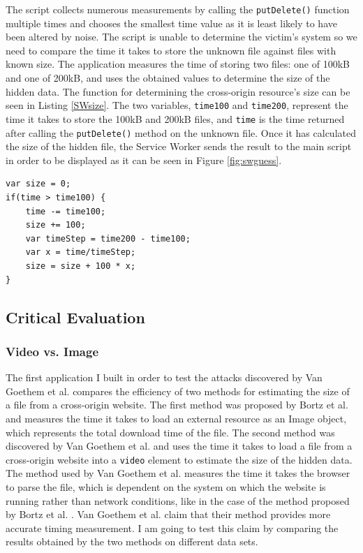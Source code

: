 \documentclass[10pt,a4paper,twoside]{book}
\begin{document}
The script collects numerous measurements by calling the \texttt{putDelete()} function multiple times and chooses the smallest time value as it is least likely to have been altered by noise. The script is unable to determine the victim's system so we need to compare the time it takes to store the unknown file against files with known size. The application measures the time of storing two files: one of 100kB and one of 200kB, and uses the obtained values to determine the size of the hidden data. The function for determining the cross-origin resource's size can be seen in Listing \ref{SWsize}. The two variables, \texttt{time100} and \texttt{time200}, represent the time it takes to store the 100kB and 200kB files, and \texttt{time} is the time returned after calling the \texttt{putDelete()} method on the unknown file. Once it has calculated the size of the hidden file, the Service Worker sends the result to the main script in order to be displayed as it can be seen in Figure \ref{fig:swguess}.

\begin{lstlisting}[caption={JavaScript code for estimating the size of a file.},label={SWsize}]
var size = 0;
if(time > time100) {
    time -= time100;
    size += 100;
    var timeStep = time200 - time100;
    var x = time/timeStep;
    size = size + 100 * x;
}
\end{lstlisting}

\subsection{Critical Evaluation}

\subsubsection{Video vs. Image}

The first application I built in order to test the attacks discovered by Van Goethem et al. \cite{van2015clock} compares the efficiency of two methods for estimating the size of a file from a cross-origin website. The first method was proposed by Bortz et al. \cite{bortz2007exposing} and measures the time it takes to load an external resource as an Image object, which represents the total download time of the file. The second method was discovered by Van Goethem et al. \cite{van2015clock} and uses the time it takes to load a file from a cross-origin website into a \texttt{video} element to estimate the size of the hidden data. The method used by Van Goethem et al. \cite{van2015clock} measures the time it takes the browser to parse the file, which is dependent on the system on which the website is running rather than network conditions, like in the case of the method proposed by Bortz et al. \cite{bortz2007exposing}. Van Goethem et al. \cite{van2015clock} claim that their method provides more accurate timing measurement. I am going to test this claim by comparing the results obtained by the two methods on different data sets.
\end{document}
